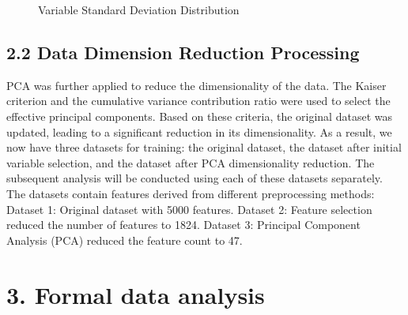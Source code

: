 \documentclass[
  12pt,
  letterpaper,
  DIV=11,
  numbers=noendperiod]{scrartcl}
\begin{document}
\begin{figure}


\caption{\label{fig-init1}Variable Standard Deviation Distribution}

\end{figure}%

\subsection{2.2 Data Dimension Reduction
Processing}\label{data-dimension-reduction-processing}

PCA was further applied to reduce the dimensionality of the data. The
Kaiser criterion and the cumulative variance contribution ratio were
used to select the effective principal components. Based on these
criteria, the original dataset was updated, leading to a significant
reduction in its dimensionality. As a result, we now have three datasets
for training: the original dataset, the dataset after initial variable
selection, and the dataset after PCA dimensionality reduction. The
subsequent analysis will be conducted using each of these datasets
separately. The datasets contain features derived from different
preprocessing methods: Dataset 1: Original dataset with 5000 features.
Dataset 2: Feature selection reduced the number of features to 1824.
Dataset 3: Principal Component Analysis (PCA) reduced the feature count
to 47.

\section{3. Formal data analysis}\label{formal-data-analysis}
\end{document}
